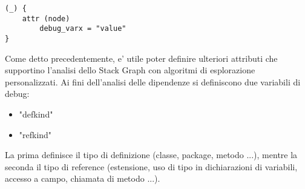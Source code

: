 \begin{verbatim}
(_) {
    attr (node)
        debug_varx = "value"
}
\end{verbatim}

Come detto precedentemente, e' utile poter definire ulteriori attributi che supportino l'analisi dello Stack Graph con algoritmi di esplorazione personalizzati.
Ai fini dell'analisi delle dipendenze si definiscono due variabili di debug:

\begin{itemize}
    \item "defkind"
    \item "refkind"
\end{itemize}

La prima definisce il tipo di definizione (classe, package, metodo ...), mentre la seconda il tipo di reference (estensione, uso di tipo in dichiarazioni di variabili, accesso a campo, chiamata di metodo ...).
